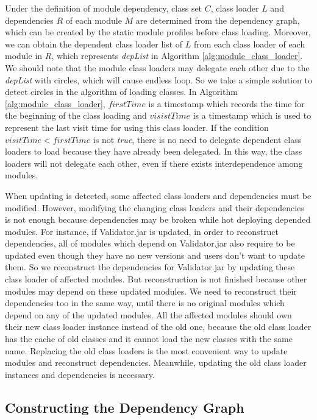 \documentclass[conference]{IEEEtran}
\begin{document}
Under the definition of module dependency, class set $C$, class loader $L$ and dependencies $R$ of each module $M$ are determined from the dependency graph, which can be created by the static module profiles before class loading.
Moreover, we can obtain the dependent class loader list of $L$ from each class loader of each module in $R$, which represents \emph{depList} in Algorithm \ref{alg:module_class_loader}. 
We should note that the module class loaders may delegate each other due to the \emph{depList} with circles, which will cause endless loop.
So we take a simple solution to detect circles in the algorithm of loading classes.
In Algorithm \ref{alg:module_class_loader}, $firstTime$ is a timestamp which records the time for the beginning of the class loading and $visistTime$ is a timestamp which is used to represent the last visit time for using this class loader. 
If the condition $visitTime < firstTime$ is not \emph{true}, there is no need to delegate dependent class loaders to load because they have already been delegated.
In this way, the class loaders will not delegate each other, even if there exists interdependence among modules.

When updating is detected, some affected class loaders and dependencies must be modified.
However, modifying the changing class loaders and their dependencies is not enough because dependencies may be broken while hot deploying depended modules.
For instance, if Validator.jar is updated, in order to reconstruct dependencies, all of modules which depend on Validator.jar also require to be updated even though they have no new versions and users don't want to update them.
So we reconstruct the dependencies for Validator.jar by updating these class loader of affected modules.
But reconstruction is not finished because other modules may depend on these updated modules.
We need to reconstruct their dependencies too in the same way, until there is no original modules which depend on any of the updated modules.
All the affected modules should own their new class loader instance instead of the old one, because the old class loader has the cache of old classes and it cannot load the new classes with the same name.
Replacing the old class loaders is the most convenient way to update modules and reconstruct dependencies.
Meanwhile, updating the old class loader instances and dependencies is necessary.



\subsection{Constructing the Dependency Graph}
\end{document}
